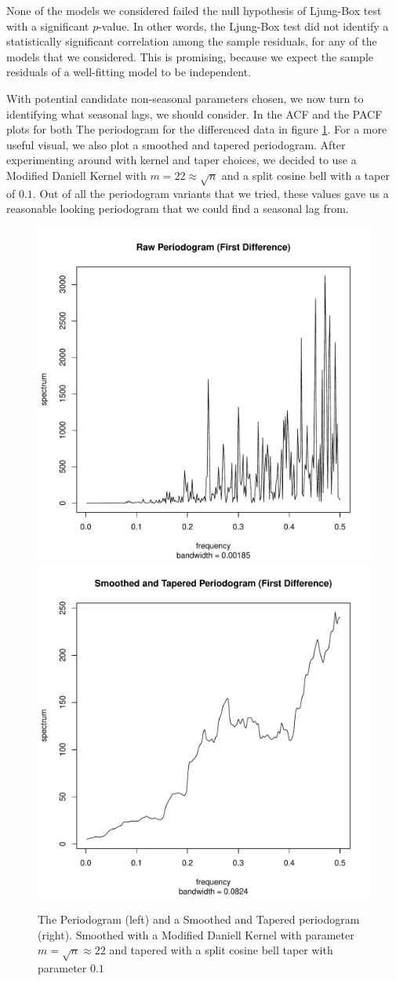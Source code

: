 \documentclass[11pt]{paper}
\begin{document}

None of the models we considered failed the null hypothesis of Ljung-Box test with a significant $p$-value. In other words, the Ljung-Box test did not identify a statistically significant correlation among the sample residuals, for any of the models that we considered. This is promising, because we expect the sample residuals of a well-fitting model to be independent.


With potential candidate non-seasonal parameters chosen, we now turn to identifying what seasonal lags, we should consider. In the ACF and the PACF plots for both The periodogram for the differenced data in figure \ref{periodogram}. For a more useful visual, we also plot a smoothed and tapered periodogram. After experimenting around with kernel and taper choices, we decided to use a Modified Daniell Kernel with $m = 22 \approx \sqrt{n}$ and a split cosine bell with a taper of $0.1$. Out of all the periodogram variants that we tried, these values gave us a reasonable looking periodogram that we could find a seasonal lag from. 

\begin{figure}
\centering
\includegraphics[width=0.45\linewidth]{../image/raw_periodogram.pdf}
\includegraphics[width=0.45\linewidth]{../image/smooth_tapered_periodogram.pdf}
\caption{The Periodogram (left) and a Smoothed and Tapered periodogram (right). Smoothed with a Modified Daniell Kernel with parameter $m = \sqrt{n} \approx 22$ and tapered with a split cosine bell taper with parameter $0.1$}
\label{periodogram}
\end{figure}
\end{document}
